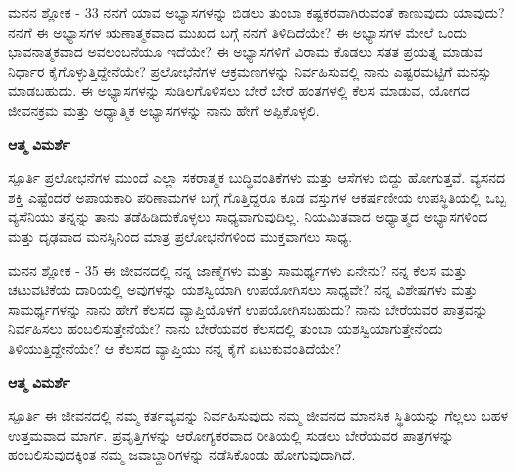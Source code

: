 
\newpage
\begin{mananam}{\mananamfont ಮನನ ಶ್ಲೋಕ - \textenglish{33}}
\footnotesize \mananamtext ನನಗೆ ಯಾವ ಅಭ್ಯಾಸಗಳನ್ನು ಬಿಡಲು ತುಂಬಾ ಕಷ್ಟಕರವಾಗಿರುವಂತೆ ಕಾಣುವುದು ಯಾವುದು? ನನಗೆ ಈ ಅಭ್ಯಾಸಗಳ ಋಣಾತ್ಮಕವಾದ ಮುಖದ ಬಗ್ಗೆ ನನಗೆ ತಿಳಿದಿದೆಯೇ? ಈ ಅಭ್ಯಾಸಗಳ ಮೇಲೆ ಒಂದು ಭಾವನಾತ್ಮಕವಾದ ಅವಲಂಬನೆಯೂ ಇದೆಯೇ? ಈ ಅಭ್ಯಾಸಗಳಿಗೆ ವಿರಾಮ ಕೊಡಲು ಸತತ ಪ್ರಯತ್ನ ಮಾಡುವ ನಿರ್ಧಾರ ಕೈಗೊಳ್ಳುತ್ತಿದ್ದೇನೆಯೇ? ಪ್ರಲೋಭೆನೆಗಳ ಆಕ್ರಮಣಗಳನ್ನು ನಿರ್ವಹಿಸುವಲ್ಲಿ ನಾನು ಎಷ್ಟರಮಟ್ಟಿಗೆ ಮನಸ್ಸು ಮಾಡಬಹುದು. ಈ ಅಭ್ಯಾಸಗಳನ್ನು ಸುಡಿಲಗೊಳಿಸಲು ಬೇರೆ ಬೇರೆ ಹಂತಗಳಲ್ಲಿ ಕೆಲಸ ಮಾಡುವ, ಯೋಗದ ಜೀವನಕ್ರಮ ಮತ್ತು ಅಧ್ಯಾತ್ಮಿಕ ಅಭ್ಯಾಸಗಳನ್ನು ನಾನು ಹೇಗೆ ಅಪ್ಪಿಕೊಳ್ಳಲಿ.
\end{mananam}
\WritingHand\enspace\textbf{ಆತ್ಮ ವಿಮರ್ಶೆ}\\
\begin{inspiration}{\mananamfont ಸ್ಪೂರ್ತಿ}
\footnotesize \mananamtext ಪ್ರಲೋಭನೆಗಳ ಮುಂದೆ ಎಲ್ಲಾ ಸಕರಾತ್ಮಕ ಬುದ್ಧಿವಂತಿಕೆಗಳು ಮತ್ತು ಆಸೆಗಳು ಬಿದ್ದು ಹೋಗುತ್ತವೆ. ವ್ಯಸನದ ಶಕ್ತಿ ಎಷ್ಟೆಂದರೆ ಅಪಾಯಕಾರಿ ಪರಿಣಾಮಗಳ ಬಗ್ಗೆ ಗೊತ್ತಿದ್ದರೂ ಕೂಡ ವಸ್ತುಗಳ ಆಕರ್ಷಣೀಯ ಉಪಸ್ಥಿತಿಯಲ್ಲಿ ಒಬ್ಬ ವ್ಯಸೆನಿಯು ತನ್ನನ್ನು ತಾನು ತಡೆಹಿಡಿದುಕೊಳ್ಳಲು ಸಾಧ್ಯವಾಗುವುದಿಲ್ಲ. ನಿಯಮಿತವಾದ ಅಧ್ಯಾತ್ಮದ ಅಭ್ಯಾಸಗಳಿಂದ ಮತ್ತು ದೃಢವಾದ ಮನಸ್ಸಿನಿಂದ ಮಾತ್ರ ಪ್ರಲೋಭನೆಗಳಿಂದ ಮುಕ್ತವಾಗಲು ಸಾಧ್ಯ.
\end{inspiration}
\newpage


\newpage
\begin{mananam}{\mananamfont ಮನನ ಶ್ಲೋಕ - \textenglish{35}}
\footnotesize \mananamtext ಈ ಜೀವನದಲ್ಲಿ ನನ್ನ ಜಾಣ್ಮೆಗಳು ಮತ್ತು ಸಾಮರ್ಥ್ಯಗಳು ಏನೇನು? ನನ್ನ ಕೆಲಸ ಮತ್ತು ಚಟುವಟಿಕೆಯ ದಾರಿಯಲ್ಲಿ ಅವುಗಳನ್ನು ಯಶಸ್ವಿಯಾಗಿ ಉಪಯೋಗಿಸಲು ಸಾಧ್ಯವೇ? ನನ್ನ ವಿಶೇಷಗಳು ಮತ್ತು ಸಾಮರ್ಥ್ಯಗಳನ್ನು ನಾನು ಹೇಗೆ ಕೆಲಸದ ವ್ಯಾಪ್ತಿಯೊಳಗೆ ಉಪಯೋಗಿಸಬಹುದು? ನಾನು ಬೇರೆಯವರ ಪಾತ್ರವನ್ನು ನಿರ್ವಹಿಸಲು ಹಂಬಲಿಸುತ್ತೇನೆಯೇ? ನಾನು ಬೇರೆಯವರ ಕೆಲಸದಲ್ಲಿ ತುಂಬಾ ಯಶಸ್ವಿಯಾಗುತ್ತೇನೆಂದು ತಿಳಿಯುತ್ತಿದ್ದೇನೆಯೇ? ಆ ಕೆಲಸದ ವ್ಯಾಪ್ತಿಯು ನನ್ನ ಕೈಗೆ ಏಟುಕುವಂತಿದೆಯೇ?
\end{mananam}
\WritingHand\enspace\textbf{ಆತ್ಮ ವಿಮರ್ಶೆ}\\
\begin{inspiration}{\mananamfont ಸ್ಪೂರ್ತಿ}
\footnotesize \mananamtext ಈ ಜೀವನದಲ್ಲಿ ನಮ್ಮ ಕರ್ತವ್ಯವನ್ನು ನಿರ್ವಹಿಸುವುದು ನಮ್ಮ ಜೀವನದ ಮಾನಸಿಕ ಸ್ಥಿತಿಯನ್ನು ಗೆಲ್ಲಲು ಬಹಳ ಉತ್ತಮವಾದ ಮಾರ್ಗ. ಪ್ರವೃತ್ತಿಗಳನ್ನು ಆರೋಗ್ಯಕರವಾದ ರೀತಿಯಲ್ಲಿ ಸುಡಲು ಬೇರೆಯವರ ಪಾತ್ರಗಳನ್ನು ಹಂಬಲಿಸುವುದಕ್ಕಿಂತ ನಮ್ಮ ಜವಾಬ್ದಾರಿಗಳನ್ನು ನಡೆಸಿಕೊಂಡು ಹೋಗುವುದಾಗಿದೆ.
\end{inspiration}
\newpage

